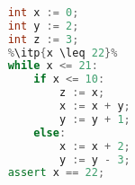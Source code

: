 \begin{lstlisting}[language=C++,basicstyle=\ttfamily,keywordstyle=\color{blue}, escapechar=\%]  % Start your code-block
	
	int x := 0;
	int y := 2;
	int z := 3;
	%\itp{x \leq 22}%
	while x <= 21:
		if x <= 10:
			z := x;
			x := x + y;
			y := y + 1;
		else:
			x := x + 2;
			y := y - 3;
	assert x == 22;
	\end{lstlisting}